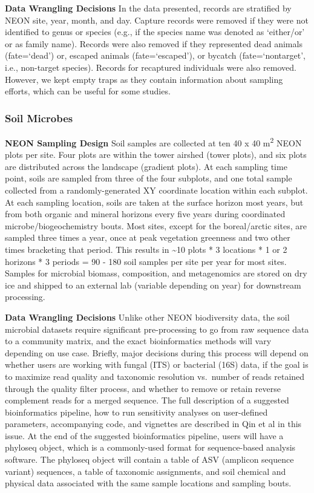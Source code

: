 \documentclass[
  12pt,
]{article}
\begin{document}
\textbf{Data Wrangling Decisions} In the data presented, records are stratified by NEON site, year, month, and day. Capture records were removed if they were not identified to genus or species (e.g., if the species name was denoted as `either/or' or as family name). Records were also removed if they represented dead animals (fate=`dead') or, escaped animals (fate=`escaped'), or bycatch (fate=`nontarget', i.e., non-target species). Records for recaptured individuals were also removed. However, we kept empty traps as they contain information about sampling efforts, which can be useful for some studies.

\hypertarget{soil-microbes}{%
\subsubsection{Soil Microbes}\label{soil-microbes}}

\textbf{NEON Sampling Design} Soil samples are collected at ten 40 x 40 m\textsuperscript{2} NEON plots per site. Four plots are within the tower airshed (tower plots), and six plots are distributed across the landscape (gradient plots). At each sampling time point, soils are sampled from three of the four subplots, and one total sample collected from a randomly-generated XY coordinate location within each subplot. At each sampling location, soils are taken at the surface horizon most years, but from both organic and mineral horizons every five years during coordinated microbe/biogeochemistry bouts. Most sites, except for the boreal/arctic sites, are sampled three times a year, once at peak vegetation greenness and two other times bracketing that period. This results in \textasciitilde10 plots * 3 locations * 1 or 2 horizons * 3 periods = 90 - 180 soil samples per site per year for most sites. Samples for microbial biomass, composition, and metagenomics are stored on dry ice and shipped to an external lab (variable depending on year) for downstream processing.

\textbf{Data Wrangling Decisions} Unlike other NEON biodiversity data, the soil microbial datasets require significant pre-processing to go from raw sequence data to a community matrix, and the exact bioinformatics methods will vary depending on use case. Briefly, major decisions during this process will depend on whether users are working with fungal (ITS) or bacterial (16S) data, if the goal is to maximize read quality and taxonomic resolution vs.~number of reads retained through the quality filter process, and whether to remove or retain reverse complement reads for a merged sequence. The full description of a suggested bioinformatics pipeline, how to run sensitivity analyses on user-defined parameters, accompanying code, and vignettes are described in Qin et al in this issue. At the end of the suggested bioinformatics pipeline, users will have a phyloseq object, which is a commonly-used format for sequence-based analysis software. The phyloseq object will contain a table of ASV (amplicon sequence variant) sequences, a table of taxonomic assignments, and soil chemical and physical data associated with the same sample locations and sampling bouts.
\end{document}
